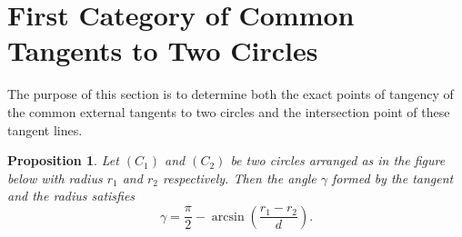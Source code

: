 \documentclass{article}
\newtheorem{proposition}{Proposition}
\begin{document}
\section{First Category of Common Tangents to Two Circles}

The purpose of this section is to determine both the exact points of
tangency of the common external tangents to two circles and the
intersection point of these tangent lines.

\begin{proposition}
  Let $(C_1)$ and $(C_2)$ be two circles arranged as in the figure
  below with radius $r_1$ and $r_2$ respectively.
  Then the angle $\gamma$ formed by the tangent and the radius satisfies
  \[
    \gamma
    =
    \frac{\pi}{2}
    -
    \arcsin\!\left(\frac{r_1 - r_2}{d}\right).
  \]
\end{proposition}

\begin{center}
  
\end{center}
\end{document}
